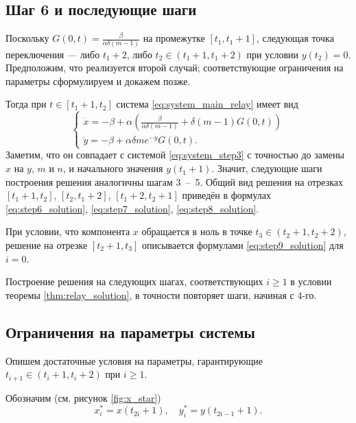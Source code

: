 \subsection{Шаг 6 и последующие шаги}
Поскольку $G(0, t) = \frac{\beta}{\alpha \delta (m - 1)}$ на промежутке $[t_1, t_1 + 1]$, следующая точка переключения --- либо $t_1 + 2$, либо $t_2 \in (t_1 + 1, t_1 + 2)$ при условии $y(t_2) = 0$. Предположим, что реализуется второй случай; соответствующие ограничения на параметры сформулируем и докажем позже.

Тогда при $t \in [t_1 + 1, t_2]$ система \eqref{eq:system_main_relay} имеет вид
%
\begin{equation}
	\label{eq:step6_system}
	\begin{cases}
		\dot{x} = -\beta + \alpha \left(\frac{\beta}{\alpha \delta (m - 1)} + \delta (m - 1) G(0, t)\right)\\
		\dot{y} = -\beta + \alpha \delta m e^{-y} G(0, t).
	\end{cases}
\end{equation}
%
Заметим, что он совпадает с системой \eqref{eq:system_step3} с точностью до замены $x$ на $y$, $m$ и $n$, и начального значения $y(t_1 + 1)$. Значит, следующие шаги построения решения аналогичны шагам 3~--~5. Общий вид решения на отрезках $[t_1 + 1, t_2]$, $[t_2, t_1 + 2]$, $[t_1 + 2, t_2 + 1]$ приведён в формулах \eqref{eq:step6_solution}, \eqref{eq:step7_solution},  \eqref{eq:step8_solution}.

При условии, что компонента $x$ обращается в ноль в точке $t_3 \in (t_2 + 1, t_2 + 2)$, решение на отрезке $[t_2 + 1, t_3]$ описывается формулами \eqref{eq:step9_solution} для $i = 0$.

Построение решения на следующих шагах, соответствующих $i \geqslant 1$ в условии теоремы \ref{thm:relay_solution}, в точности повторяет шаги, начиная с 4-го.

\subsection{Ограничения на параметры системы}
Опишем достаточные условия на параметры, гарантирующие $t_{i + 1} \in (t_i + 1, t_i + 2)$ при $i \geqslant 1$.

Обозначим (см. рисунок \ref{fig:x_star})
\begin{equation}
	\label{eq:x_star_definition}
	x^*_i = x(t_{2i} + 1), \quad y^*_i = y(t_{2i - 1} + 1).
\end{equation}

